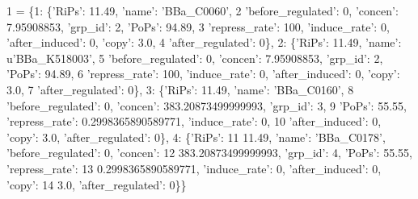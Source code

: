 \begin{DoxyCode}
1 = \{1: \{\textcolor{stringliteral}{'RiPs'}: 11.49, \textcolor{stringliteral}{'name'}: \textcolor{stringliteral}{'BBa\_C0060'},
2     \textcolor{stringliteral}{'before\_regulated'}: 0, \textcolor{stringliteral}{'concen'}: 7.95908853, \textcolor{stringliteral}{'grp\_id'}: 2, \textcolor{stringliteral}{'PoPs'}: 94.89,
3     \textcolor{stringliteral}{'repress\_rate'}: 100, \textcolor{stringliteral}{'induce\_rate'}: 0, \textcolor{stringliteral}{'after\_induced'}: 0, \textcolor{stringliteral}{'copy'}: 3.0,
4     \textcolor{stringliteral}{'after\_regulated'}: 0\}, 2: \{\textcolor{stringliteral}{'RiPs'}: 11.49, \textcolor{stringliteral}{'name'}: \textcolor{stringliteral}{u'BBa\_K518003'},
5       \textcolor{stringliteral}{'before\_regulated'}: 0, \textcolor{stringliteral}{'concen'}: 7.95908853, \textcolor{stringliteral}{'grp\_id'}: 2, \textcolor{stringliteral}{'PoPs'}: 94.89,
6       \textcolor{stringliteral}{'repress\_rate'}: 100, \textcolor{stringliteral}{'induce\_rate'}: 0, \textcolor{stringliteral}{'after\_induced'}: 0, \textcolor{stringliteral}{'copy'}: 3.0,
7       \textcolor{stringliteral}{'after\_regulated'}: 0\}, 3: \{\textcolor{stringliteral}{'RiPs'}: 11.49, \textcolor{stringliteral}{'name'}: \textcolor{stringliteral}{'BBa\_C0160'},
8         \textcolor{stringliteral}{'before\_regulated'}: 0, \textcolor{stringliteral}{'concen'}: 383.20873499999993, \textcolor{stringliteral}{'grp\_id'}: 3,
9         \textcolor{stringliteral}{'PoPs'}: 55.55, \textcolor{stringliteral}{'repress\_rate'}: 0.2998365890589771, \textcolor{stringliteral}{'induce\_rate'}: 0,
10         \textcolor{stringliteral}{'after\_induced'}: 0, \textcolor{stringliteral}{'copy'}: 3.0, \textcolor{stringliteral}{'after\_regulated'}: 0\}, 4: \{\textcolor{stringliteral}{'RiPs'}:
11           11.49, \textcolor{stringliteral}{'name'}: \textcolor{stringliteral}{'BBa\_C0178'}, \textcolor{stringliteral}{'before\_regulated'}: 0, \textcolor{stringliteral}{'concen'}:
12           383.20873499999993, \textcolor{stringliteral}{'grp\_id'}: 4, \textcolor{stringliteral}{'PoPs'}: 55.55, \textcolor{stringliteral}{'repress\_rate'}:
13           0.2998365890589771, \textcolor{stringliteral}{'induce\_rate'}: 0, \textcolor{stringliteral}{'after\_induced'}: 0, \textcolor{stringliteral}{'copy'}:
14           3.0, \textcolor{stringliteral}{'after\_regulated'}: 0\}\}
\end{DoxyCode}
